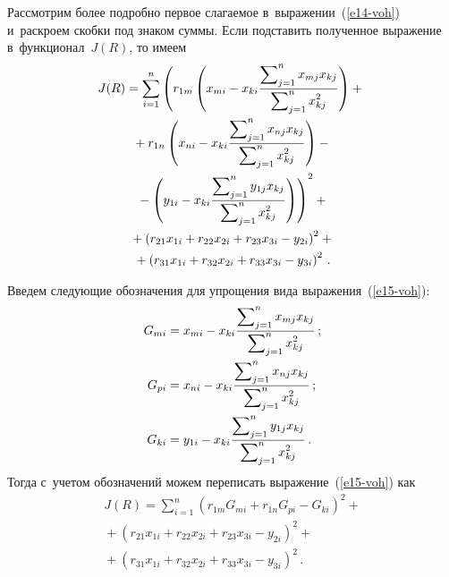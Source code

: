 \begin{multicols}{2}
  Рассмотрим более подробно первое сла\-га\-емое в~выражении~(\ref{e14-voh}) 
и~раскроем скоб\-ки под знаком суммы. Если подставить полученное выражение 
в~функционал~$J(R)$, то имеем
  \begin{multline}
  J(R)=\sum\limits^n_{i=1}\left( r_{1m}\left(
  x_{mi}-x_{ki}\displaystyle\frac{\displaystyle \sum\nolimits^n_{j=1} x_{mj} x_{kj}\mathstrut}{\displaystyle \sum\nolimits^n_{j=1} x^2_{kj}\mathstrut}\right)
  +{}\right.\\
  {}+r_{1n}\left( x_{ni}-x_{ki}\displaystyle\frac{\displaystyle \sum\nolimits^n_{j=1} x_{nj} x_{kj}\mathstrut}{\displaystyle \sum\nolimits^n_{j=1} x^2_{kj}\mathstrut}\right)-{}\\
 \left. {}-\left( y_{1i}-x_{ki}
  \displaystyle\frac{\displaystyle \sum\nolimits^n_{j=1} y_{1j} x_{kj}\mathstrut}{\displaystyle \sum\nolimits^n_{j=1} x^2_{kj}\mathstrut}\right)\right)^2+{}\\
  {}+
 \left( r_{21}x_{1i}+r_{22} x_{2i}+r_{23}x_{3i}-
y_{2i}\right)^2 +{}\\
  {}+\left( r_{31}x_{1i}+r_{32} x_{2i}+r_{33}x_{3i}-y_{3i}\right)^2\,.
  \label{e15-voh}
  \end{multline}
  
  Введем следующие обозначения для упрощения вида  
выражения~(\ref{e15-voh}):
  \begin{align*}
  G_{mi}&=x_{{m}i}-x_{ki} \displaystyle\frac{\displaystyle \sum\nolimits^n_{j=1} x_{mj} x_{kj}\mathstrut}{\displaystyle \sum\nolimits^n_{j=1} x^2_{kj}\mathstrut}\,;\\
  G_{pi}&=x_{ni}- x_{ki} \displaystyle\frac{\displaystyle \sum\nolimits^n_{j=1} x_{nj} x_{kj}\mathstrut}{\displaystyle \sum\nolimits^n_{j=1} x^2_{kj}\mathstrut}\,;\\
  G_{ki}&=y_{1i}- x_{ki} \displaystyle\frac{\displaystyle \sum\nolimits^n_{j=1} y_{1j} x_{kj}\mathstrut}{\displaystyle \sum\nolimits^n_{j=1} x^2_{kj}\mathstrut}\,.
  \end{align*}
Тогда с~учетом обозначений можем переписать выражение~(\ref{e15-voh}) как
\begin{multline}
J(R)=\sum\limits^n_{i=1}\left( r_{1{m}} G_{mi}+r_{1{n}}G_{pi} 
-G_{ki}\right)^2+{}\\
{}+ \left( r_{21}x_{1i} +r_{22}x_{2i} +r_{23}x_{3i}-y_{2i}\right)^2+{}\\
{}+ \left( r_{31}x_{1i} +r_{32}x_{2i} +r_{33}x_{3i}-y_{3i}\right)^2\,.
\label{e16-voh}
\end{multline}
  

\end{multicols}
